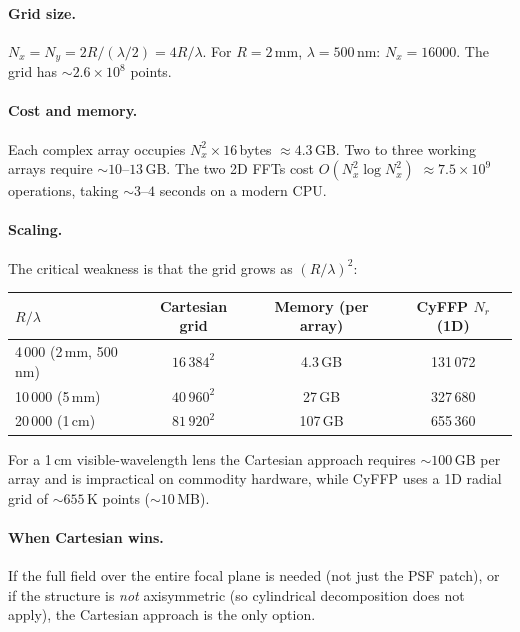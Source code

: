 \documentclass[11pt,a4paper]{article}
\begin{document}
\paragraph{Grid size.}
$N_x = N_y = 2R/(\lambda/2) = 4R/\lambda$.
For $R = 2$\,mm, $\lambda = 500$\,nm: $N_x = 16000$.  The grid has
${\sim}2.6\times 10^8$ points.

\paragraph{Cost and memory.}
Each complex array occupies $N_x^2 \times 16$\,bytes $\approx 4.3$\,GB.
Two to three working arrays require ${\sim}10$--$13$\,GB.
The two 2D FFTs cost $O(N_x^2 \log N_x^2)$ $\approx 7.5\times 10^9$ operations,
taking ${\sim}3$--$4$ seconds on a modern CPU.

\paragraph{Scaling.}
The critical weakness is that the grid grows as $(R/\lambda)^2$:

\begin{center}
\begin{tabular}{@{}lccc@{}}
\toprule
$R/\lambda$ & Cartesian grid & Memory (per array) & CyFFP $N_r$ (1D) \\
\midrule
4\,000 (2\,mm, 500\,nm) & $16\,384^2$ & 4.3\,GB & 131\,072 \\
10\,000 (5\,mm)          & $40\,960^2$ & 27\,GB  & 327\,680 \\
20\,000 (1\,cm)          & $81\,920^2$ & 107\,GB & 655\,360 \\
\bottomrule
\end{tabular}
\end{center}

\noindent
For a 1\,cm visible-wavelength lens the Cartesian approach requires ${\sim}100$\,GB
per array and is impractical on commodity hardware, while CyFFP uses a 1D radial
grid of ${\sim}655$\,K points (${\sim}10$\,MB).

\paragraph{When Cartesian wins.}
If the full field over the entire focal plane is needed (not just the PSF patch),
or if the structure is \emph{not} axisymmetric (so cylindrical decomposition
does not apply), the Cartesian approach is the only option.


\end{document}
